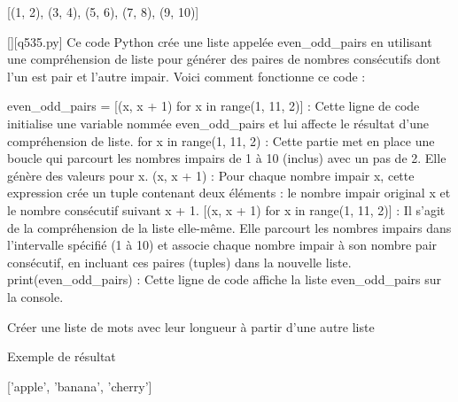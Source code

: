 [(1, 2), (3, 4), (5, 6), (7, 8), (9, 10)]
        \par
        \begin{solution}
            \renewcommand{\nomfichier}{q535.py}
            \pythonfile{\chemincode \nomfichier}[][\nomfichier]
            Ce code Python crée une liste appelée even_odd_pairs en utilisant une compréhension de liste pour générer des paires de nombres consécutifs dont l'un est pair et l'autre impair. Voici comment fonctionne ce code :

    even_odd_pairs = [(x, x + 1) for x in range(1, 11, 2)] : Cette ligne de code initialise une variable nommée even_odd_pairs et lui affecte le résultat d'une compréhension de liste.
        for x in range(1, 11, 2) : Cette partie met en place une boucle qui parcourt les nombres impairs de 1 à 10 (inclus) avec un pas de 2. Elle génère des valeurs pour x.
        (x, x + 1) : Pour chaque nombre impair x, cette expression crée un tuple contenant deux éléments : le nombre impair original x et le nombre consécutif suivant x + 1.
        [(x, x + 1) for x in range(1, 11, 2)] : Il s'agit de la compréhension de la liste elle-même. Elle parcourt les nombres impairs dans l'intervalle spécifié (1 à 10) et associe chaque nombre impair à son nombre pair consécutif, en incluant ces paires (tuples) dans la nouvelle liste.
    print(even_odd_pairs) : Cette ligne de code affiche la liste even_odd_pairs sur la console.
        \end{solution}
        

        \question
        Créer une liste de mots avec leur longueur à partir d'une autre liste

Exemple de résultat

['apple', 'banana', 'cherry']

